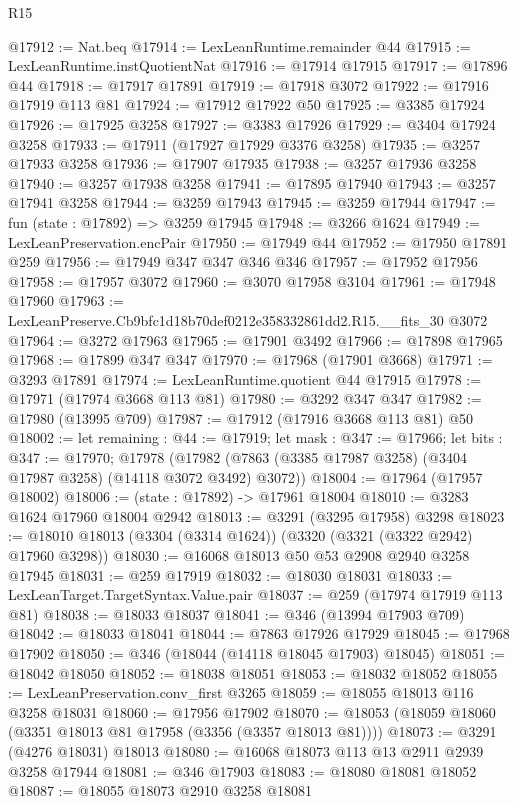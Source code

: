 \begin{lexlean}{R15}
\begin{coremodule}
@17912 := Nat.beq
@17914 := LexLeanRuntime.remainder @44
@17915 := LexLeanRuntime.instQuotientNat
@17916 := @17914 @17915
@17917 := @17896 @44
@17918 := @17917 @17891
@17919 := @17918 @3072
@17922 := @17916 @17919 @113 @81
@17924 := @17912 @17922 @50
@17925 := @3385 @17924
@17926 := @17925 @3258
@17927 := @3383 @17926
@17929 := @3404 @17924 @3258
@17933 := @17911 (@17927 @17929 @3376 @3258)
@17935 := @3257 @17933 @3258
@17936 := @17907 @17935
@17938 := @3257 @17936 @3258
@17940 := @3257 @17938 @3258
@17941 := @17895 @17940
@17943 := @3257 @17941 @3258
@17944 := @3259 @17943
@17945 := @3259 @17944
@17947 := fun (state : @17892) => @3259 @17945
@17948 := @3266 @1624
@17949 := LexLeanPreservation.encPair
@17950 := @17949 @44
@17952 := @17950 @17891 @259
@17956 := @17949 @347 @347 @346 @346
@17957 := @17952 @17956
@17958 := @17957 @3072
@17960 := @3070 @17958 @3104
@17961 := @17948 @17960
@17963 := LexLeanPreserve.Cb9bfc1d18b70def0212e358332861dd2.R15.__fits_30 @3072
@17964 := @3272 @17963
@17965 := @17901 @3492
@17966 := @17898 @17965
@17968 := @17899 @347 @347
@17970 := @17968 (@17901 @3668)
@17971 := @3293 @17891
@17974 := LexLeanRuntime.quotient @44 @17915
@17978 := @17971 (@17974 @3668 @113 @81)
@17980 := @3292 @347 @347
@17982 := @17980 (@13995 @709)
@17987 := @17912 (@17916 @3668 @113 @81) @50
@18002 := let remaining : @44 := @17919;
  let mask : @347 := @17966;
  let bits : @347 := @17970;
  @17978 (@17982 (@7863 (@3385 @17987 @3258) (@3404 @17987 @3258) (@14118 @3072 @3492) @3072))
@18004 := @17964 (@17957 @18002)
@18006 := (state : @17892) -> @17961 @18004
@18010 := @3283 @1624 @17960 @18004 @2942
@18013 := @3291 (@3295 @17958) @3298
@18023 := @18010 @18013 (@3304 (@3314 @1624)) (@3320 (@3321 (@3322 @2942) @17960 @3298))
@18030 := @16068 @18013 @50 @53 @2908 @2940 @3258 @17945
@18031 := @259 @17919
@18032 := @18030 @18031
@18033 := LexLeanTarget.TargetSyntax.Value.pair
@18037 := @259 (@17974 @17919 @113 @81)
@18038 := @18033 @18037
@18041 := @346 (@13994 @17903 @709)
@18042 := @18033 @18041
@18044 := @7863 @17926 @17929
@18045 := @17968 @17902
@18050 := @346 (@18044 (@14118 @18045 @17903) @18045)
@18051 := @18042 @18050
@18052 := @18038 @18051
@18053 := @18032 @18052
@18055 := LexLeanPreservation.conv_first @3265
@18059 := @18055 @18013 @116 @3258 @18031
@18060 := @17956 @17902
@18070 := @18053 (@18059 @18060 (@3351 @18013 @81 @17958 (@3356 (@3357 @18013 @81))))
@18073 := @3291 (@4276 @18031) @18013
@18080 := @16068 @18073 @113 @13 @2911 @2939 @3258 @17944
@18081 := @346 @17903
@18083 := @18080 @18081 @18052
@18087 := @18055 @18073 @2910 @3258 @18081

\end{coremodule}
\end{lexlean}
